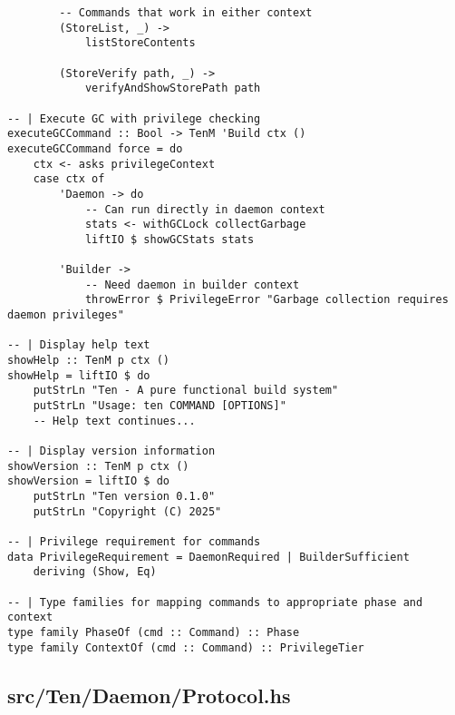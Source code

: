 \documentclass{article}
\begin{document}
\begin{tcolorbox}[title=Ten/CLI.hs Changes]
\begin{verbatim}
        -- Commands that work in either context
        (StoreList, _) ->
            listStoreContents

        (StoreVerify path, _) ->
            verifyAndShowStorePath path

-- | Execute GC with privilege checking
executeGCCommand :: Bool -> TenM 'Build ctx ()
executeGCCommand force = do
    ctx <- asks privilegeContext
    case ctx of
        'Daemon -> do
            -- Can run directly in daemon context
            stats <- withGCLock collectGarbage
            liftIO $ showGCStats stats

        'Builder ->
            -- Need daemon in builder context
            throwError $ PrivilegeError "Garbage collection requires daemon privileges"

-- | Display help text
showHelp :: TenM p ctx ()
showHelp = liftIO $ do
    putStrLn "Ten - A pure functional build system"
    putStrLn "Usage: ten COMMAND [OPTIONS]"
    -- Help text continues...

-- | Display version information
showVersion :: TenM p ctx ()
showVersion = liftIO $ do
    putStrLn "Ten version 0.1.0"
    putStrLn "Copyright (C) 2025"

-- | Privilege requirement for commands
data PrivilegeRequirement = DaemonRequired | BuilderSufficient
    deriving (Show, Eq)

-- | Type families for mapping commands to appropriate phase and context
type family PhaseOf (cmd :: Command) :: Phase
type family ContextOf (cmd :: Command) :: PrivilegeTier
\end{verbatim}
\end{tcolorbox}

\subsection{src/Ten/Daemon/Protocol.hs}
\end{document}
